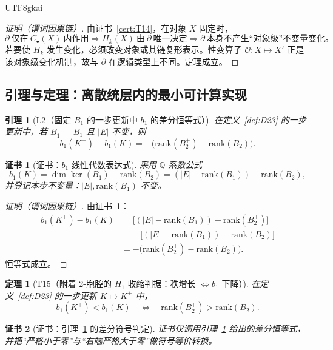\documentclass[12pt]{article}
\newtheorem{theorem}{定理}[section]
\newtheorem{lemma}{引理}[section]
\newtheorem{Certificate}{证书}[section]
\newcommand{\QQ}{\mathbb{Q}}
\begin{document}
\begin{CJK*}{UTF8}{gkai}
\begin{proof}[证明（谓词因果链）]
由证书~\ref{cert:T14}，在对象 $X$ 固定时，
\[
\partial\ \text{仅在}\ C_\bullet(X)\ \text{内作用}
\Rightarrow
H_k(X)\ \text{由}\ \partial\ \text{唯一决定}
\Rightarrow
\partial\ \text{本身不产生“对象级”不变量变化。}
\]
若要使 $H_k$ 发生变化，必须改变对象或其链复形表示。性变算子 $\mathcal O:X\mapsto X'$ 正是该对象级变化机制，故与 $\partial$ 在逻辑类型上不同。定理成立。
\end{proof}

\subsection{引理与定理：离散统层内的最小可计算实现}

\begin{lemma}[L2（固定 $B_1$ 的一步更新中 $b_1$ 的差分恒等式）]
\label{lem:L2}
在定义~\ref{def:D23} 的一步更新中，若 $B_1^+=B_1$ 且 $|E|$ 不变，则
\[
b_1(K^+)-b_1(K)= -\big(\mathrm{rank}(B_2^+)-\mathrm{rank}(B_2)\big).
\]
\end{lemma}

\begin{Certificate}[证书：$b_1$ 线性代数表达式]
\label{cert:L2}
采用 $\QQ$ 系数公式
\[
b_1(K)=\dim\ker(B_1)-\mathrm{rank}(B_2)
=(|E|-\mathrm{rank}(B_1))-\mathrm{rank}(B_2),
\]
并登记本步不变量：$|E|,\mathrm{rank}(B_1)$ 不变。
\end{Certificate}

\begin{proof}[证明（谓词因果链）]
由证书~\ref{cert:L2}：
\[
\begin{aligned}
b_1(K^+)-b_1(K)
&=\big[(|E|-\mathrm{rank}(B_1))-\mathrm{rank}(B_2^+)\big]\\
&\quad-\big[(|E|-\mathrm{rank}(B_1))-\mathrm{rank}(B_2)\big]\\
&= -\big(\mathrm{rank}(B_2^+)-\mathrm{rank}(B_2)\big).
\end{aligned}
\]
恒等式成立。
\end{proof}

\begin{theorem}[T15（附着 2-胞腔的 $H_1$ 收缩判据：秩增长 $\Leftrightarrow b_1$ 下降）]
\label{thm:T15}
在定义~\ref{def:D23} 的一步更新 $K\mapsto K^+$ 中，
\[
b_1(K^+) < b_1(K)
\quad\Longleftrightarrow\quad
\mathrm{rank}(B_2^+)>\mathrm{rank}(B_2).
\]
\end{theorem}

\begin{Certificate}[证书：引理~\ref{lem:L2} 的差分符号判定]
\label{cert:T15}
证书仅调用引理~\ref{lem:L2} 给出的差分恒等式，并把“严格小于零”与“右端严格大于零”做符号等价转换。
\end{Certificate}


\end{CJK*}
\end{document}
